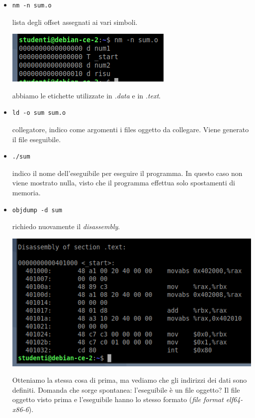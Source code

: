 \begin{itemize}
\begin{itemize}
\begin{itemize}
		\end{itemize}
		
	\end{itemize}
	
	\item \begin{verbatim}nm -n sum.o\end{verbatim}
	lista degli offset assegnati ai vari simboli.\begin{center}
		\includegraphics{img/141.PNG}
	\end{center}
	abbiamo le etichette utilizzate in \emph{.data} e in \emph{.text}.
	\item \begin{verbatim}ld -o sum sum.o\end{verbatim}
	collegatore, indico come argomenti i files oggetto da collegare. Viene generato il file eseguibile.
	\item \begin{verbatim}./sum\end{verbatim}
	indico il nome dell'eseguibile per eseguire il programma. In questo caso non viene mostrato nulla, visto che il programma effettua solo spostamenti di memoria.
	\item \begin{verbatim}objdump -d sum\end{verbatim}
	richiedo nuovamente il \emph{disassembly}. \begin{center}
		\includegraphics{img/142.PNG}
	\end{center}Otteniamo la stessa cosa di prima, ma vediamo che gli indirizzi dei dati sono definiti. Domanda che sorge spontanea: l'eseguibile è un file oggetto? Il file oggetto visto prima e l'eseguibile hanno lo stesso formato (\emph{file format elf64-x86-6}). 

\end{itemize}
